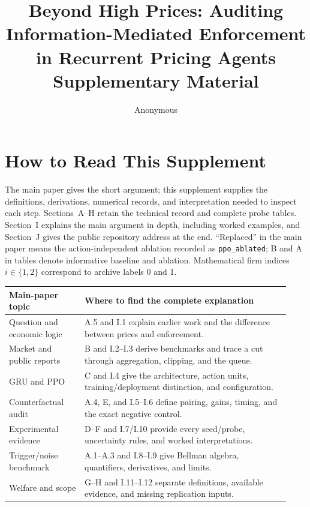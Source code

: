\documentclass{article}
\title{Beyond High Prices: Auditing Information-Mediated Enforcement in Recurrent Pricing Agents \\ \large Supplementary Material}
\author{Anonymous}
\begin{document}
\maketitle

\appendix

\section*{How to Read This Supplement}

The main paper gives the short argument; this supplement supplies the definitions, derivations, numerical records, and interpretation needed to inspect each step. Sections~A--H retain the technical record and complete probe tables. Section~I explains the main argument in depth, including worked examples, and Section~J gives the public repository address at the end. ``Replaced'' in the main paper means the action-independent ablation recorded as \texttt{ppo\_ablated}; B and A in tables denote informative baseline and ablation. Mathematical firm indices $i\in\{1,2\}$ correspond to archive labels 0 and 1.

\begin{center}
\begin{tabular}{@{}p{0.25\linewidth}p{0.68\linewidth}@{}}
\toprule
Main-paper topic & Where to find the complete explanation \\
\midrule
Question and economic logic & A.5 and I.1 explain earlier work and the difference between prices and enforcement. \\
Market and public reports & B and I.2--I.3 derive benchmarks and trace a cut through aggregation, clipping, and the queue. \\
GRU and PPO & C and I.4 give the architecture, action units, training/deployment distinction, and configuration. \\
Counterfactual audit & A.4, E, and I.5--I.6 define pairing, gains, timing, and the exact negative control. \\
Experimental evidence & D--F and I.7/I.10 provide every seed/probe, uncertainty rules, and worked interpretations. \\
Trigger/noise benchmark & A.1--A.3 and I.8--I.9 give Bellman algebra, quantifiers, derivatives, and limits. \\
Welfare and scope & G--H and I.11--I.12 separate definitions, available evidence, and missing replication inputs. \\
\bottomrule
\end{tabular}
\end{center}
\end{document}
